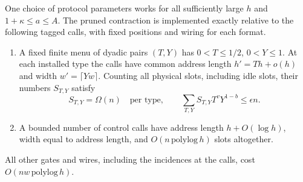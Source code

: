 \begin{lemma}\label{lem:tag-shorter}
One choice of protocol parameters works for all sufficiently
large $h$ and $1+\kappa\le a\le A$. The pruned contraction is implemented
exactly relative to the following tagged calls, with fixed positions and
wiring for each format.
\begin{enumerate}
\item A fixed finite menu of dyadic pairs $(T,Y)$ has $0<T\le1/2$,
$0<Y\le1$. At each installed type the calls have common address length
$h'=Th+o(h)$ and width $w'=\lceil Yw\rceil$. Counting all physical
slots, including idle slots, their numbers $S_{T,Y}$ satisfy
\[
       S_{T,Y}=\Omega(n)\quad\text{per type},\qquad
       \sum_{T,Y} S_{T,Y} T^v Y^{1-b}\le\epsilon n .
\]
\item A bounded number of control calls have address length
$h+O(\log h)$, width equal to address length, and
$O(n\,\mathrm{polylog}\,h)$ slots altogether.
\end{enumerate}
All other gates and wires, including the incidences at the calls, cost
$O(nw\,\mathrm{polylog}\,h)$.
\end{lemma}

